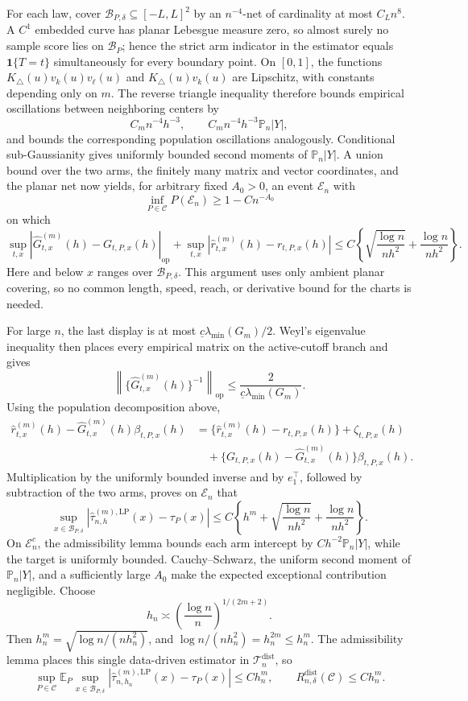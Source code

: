 For each law, cover \(\mathcal B_{P,\delta}\subseteq[-L,L]^2\) by an \(n^{-4}\)-net of cardinality at most \(C_Ln^8\).  A \(C^1\) embedded curve has planar Lebesgue measure zero, so almost surely no sample score lies on \(\mathcal B_P\); hence the strict arm indicator in the estimator equals \(\mathbf1\{T=t\}\) simultaneously for every boundary point.  On \([0,1]\), the functions \(K_\triangle(u)v_k(u)v_\ell(u)\) and \(K_\triangle(u)v_k(u)\) are Lipschitz, with constants depending only on \(m\).  The reverse triangle inequality therefore bounds empirical oscillations between neighboring centers by
\[
 C_mn^{-4}h^{-3},
 \qquad
 C_mn^{-4}h^{-3}\mathbb P_n|Y|,
\]
and bounds the corresponding population oscillations analogously.  Conditional sub-Gaussianity gives uniformly bounded second moments of \(\mathbb P_n|Y|\).  A union bound over the two arms, the finitely many matrix and vector coordinates, and the planar net now yields, for arbitrary fixed \(A_0>0\), an event \(\mathcal E_n\) with
\[
 \inf_{P\in\mathcal C}P(\mathcal E_n)\geq1-Cn^{-A_0}
\]
on which
\[
 \sup_{t,x}\left|\widehat G^{(m)}_{t,x}(h)-G_{t,P,x}(h)\right|_{\mathrm{op}}
 +\sup_{t,x}\left|\widehat r^{(m)}_{t,x}(h)-r_{t,P,x}(h)\right|
 \leq C\left\{\sqrt{\frac{\log n}{nh^2}}+\frac{\log n}{nh^2}\right\}.
\]
Here and below \(x\) ranges over \(\mathcal B_{P,\delta}\).  This argument uses only ambient planar covering, so no common length, speed, reach, or derivative bound for the charts is needed.

For large \(n\), the last display is at most \(\underline c\lambda_{\min}(G_m)/2\).  Weyl's eigenvalue inequality then places every empirical matrix on the active-cutoff branch and gives
\[
 \left\|\{\widehat G^{(m)}_{t,x}(h)\}^{-1}\right\|_{\mathrm{op}}
 \leq\frac{2}{\underline c\lambda_{\min}(G_m)}.
\]
Using the population decomposition above,
\[
\begin{aligned}
 \widehat r^{(m)}_{t,x}(h)-\widehat G^{(m)}_{t,x}(h)\beta_{t,P,x}(h)
 &=\{\widehat r^{(m)}_{t,x}(h)-r_{t,P,x}(h)\}
 +\zeta_{t,P,x}(h)\\
 &\quad+\{G_{t,P,x}(h)-\widehat G^{(m)}_{t,x}(h)\}
 \beta_{t,P,x}(h).
\end{aligned}
\]
Multiplication by the uniformly bounded inverse and by \(e_1^\top\), followed by subtraction of the two arms, proves on \(\mathcal E_n\) that
\[
 \sup_{x\in\mathcal B_{P,\delta}}
 |\widehat\tau^{(m),\mathrm{LP}}_{n,h}(x)-\tau_P(x)|
 \leq C\left\{h^m+\sqrt{\frac{\log n}{nh^2}}+
 \frac{\log n}{nh^2}\right\}.
\]
On \(\mathcal E_n^c\), the admissibility lemma bounds each arm intercept by \(Ch^{-2}\mathbb P_n|Y|\), while the target is uniformly bounded.  Cauchy--Schwarz, the uniform second moment of \(\mathbb P_n|Y|\), and a sufficiently large \(A_0\) make the expected exceptional contribution negligible.  Choose
\[
 h_n\asymp\left(\frac{\log n}{n}\right)^{1/(2m+2)}.
\]
Then \(h_n^m=\sqrt{\log n/(nh_n^2)}\), and \(\log n/(nh_n^2)=h_n^{2m}\leq h_n^m\).  The admissibility lemma places this single data-driven estimator in \(\mathcal T_n^{\mathrm{dist}}\), so
\[
 \sup_{P\in\mathcal C}\mathbb E_P\sup_{x\in\mathcal B_{P,\delta}}
 |\widehat\tau^{(m),\mathrm{LP}}_{n,h_n}(x)-\tau_P(x)|
 \leq Ch_n^m,
 \qquad
 R_{n,\delta}^{\mathrm{dist}}(\mathcal C)\leq Ch_n^m.
\]


